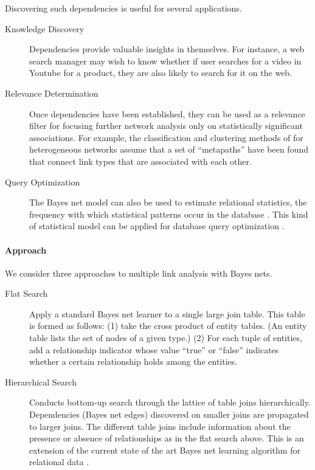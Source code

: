 \documentclass{article}
\begin{document}
Discovering such dependencies is useful for several applications. 

\begin{description}
\item[Knowledge Discovery] Dependencies provide valuable insights in themselves. For instance, a web search manager may wish to know whether if user searches for a video in Youtube for a product, they are also likely to search for it on the web. 
\item[Relevance Determination] Once dependencies have been established, they can be used as a relevance filter for focusing further network analysis only on statistically significant associations. For example, the classification and clustering methods of \cite{Sun2012} for heterogeneous networks assume that a set of ``metapaths'' have been found that connect link types that are associated with each other. 
\item[Query Optimization] The Bayes net model can also be used to estimate relational statistics, the frequency with which statistical patterns occur in the database \cite{Schulte2012b}. This kind of statistical model can be applied for database query optimization \cite{Getoor2001}.
\end{description}

\paragraph{Approach}

We consider three approaches to multiple link analysis with Bayes nets. 

\begin{description}
\item[Flat Search] Apply a standard Bayes net learner to a single large join table. This table is formed as follows: (1) take the cross product of entity tables. (An entity table lists the set of nodes of a given type.) (2) For each tuple of entities, add a relationship indicator whose value ``true'' or ``false'' indicates whether a certain relationship holds among the entities. 
\item[Hierarchical Search] Conducts bottom-up  search
 through the lattice of table joins hierarchically. Dependencies (Bayes net edges) discovered on smaller joins are propagated to larger joins. 
The different table joins include information about the presence or absence of relationships as in the flat search above. 
This is an extension of the current state of the art Bayes net learning algorithm for relational data \cite{Schulte2012}.
\end{description}
\end{document}
